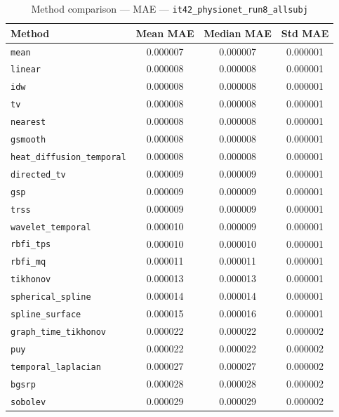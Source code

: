 \begin{table}[ht]
\centering
\caption{Method comparison — MAE — \texttt{it42_physionet_run8_allsubj}}
\label{tab:mae_it42_physionet_run8_allsubj}
\begin{tabular}{lccc}
\hline
Method & Mean MAE & Median MAE & Std MAE \\
\hline
\texttt{mean} & 0.000007 & 0.000007 & 0.000001 \\
\texttt{linear} & 0.000008 & 0.000008 & 0.000001 \\
\texttt{idw} & 0.000008 & 0.000008 & 0.000001 \\
\texttt{tv} & 0.000008 & 0.000008 & 0.000001 \\
\texttt{nearest} & 0.000008 & 0.000008 & 0.000001 \\
\texttt{gsmooth} & 0.000008 & 0.000008 & 0.000001 \\
\texttt{heat_diffusion_temporal} & 0.000008 & 0.000008 & 0.000001 \\
\texttt{directed_tv} & 0.000009 & 0.000009 & 0.000001 \\
\texttt{gsp} & 0.000009 & 0.000009 & 0.000001 \\
\texttt{trss} & 0.000009 & 0.000009 & 0.000001 \\
\texttt{wavelet_temporal} & 0.000010 & 0.000009 & 0.000001 \\
\texttt{rbfi_tps} & 0.000010 & 0.000010 & 0.000001 \\
\texttt{rbfi_mq} & 0.000011 & 0.000011 & 0.000001 \\
\texttt{tikhonov} & 0.000013 & 0.000013 & 0.000001 \\
\texttt{spherical_spline} & 0.000014 & 0.000014 & 0.000001 \\
\texttt{spline_surface} & 0.000015 & 0.000016 & 0.000001 \\
\texttt{graph_time_tikhonov} & 0.000022 & 0.000022 & 0.000002 \\
\texttt{puy} & 0.000022 & 0.000022 & 0.000002 \\
\texttt{temporal_laplacian} & 0.000027 & 0.000027 & 0.000002 \\
\texttt{bgsrp} & 0.000028 & 0.000028 & 0.000002 \\
\texttt{sobolev} & 0.000029 & 0.000029 & 0.000002 \\
\hline
\end{tabular}
\end{table}
